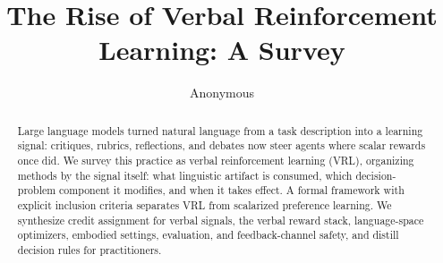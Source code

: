 \documentclass[acmsmall,screen,review]{acmart}
\begin{document}
\title{The Rise of Verbal Reinforcement Learning: A Survey}

\author{Anonymous}

\begin{abstract}
Large language models turned natural language from a task description into a learning signal: critiques, rubrics, reflections, and debates now steer agents where scalar rewards once did. We survey this practice as verbal reinforcement learning (VRL), organizing methods by the signal itself: what linguistic artifact is consumed, which decision-problem component it modifies, and when it takes effect. A formal framework with explicit inclusion criteria separates VRL from scalarized preference learning. We synthesize credit assignment for verbal signals, the verbal reward stack, language-space optimizers, embodied settings, evaluation, and feedback-channel safety, and distill decision rules for practitioners.
\end{abstract}

\maketitle


















\end{document}
